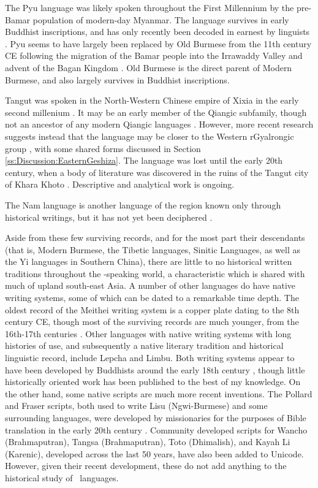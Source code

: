 The Pyu language was likely spoken throughout the First Millennium  by the pre-Bamar population of modern-day Myanmar. The language survives in early Buddhist inscriptions, and has only recently been decoded in earnest by linguists \cites{Griffiths2017}{Miyake2019}. Pyu seems to have largely been replaced by Old Burmese from the 11th century CE following the migration of the Bamar people into the Irrawaddy Valley and advent of the Bagan Kingdom \cites{Wheatley2017}{Griffiths2017}. Old Burmese is the direct parent of Modern Burmese, and also largely survives in Buddhist inscriptions.

Tangut was spoken in the North-Western Chinese empire of Xixia in the early second millenium \cite{Gong2017}. It may be an early member of the Qiangic subfamily, though not an ancestor of any modern Qiangic languages \cite{Matisoff2004}. However, more recent research suggests instead that the language may be closer to the Western rGyalrongic group \cite{Lai2020}, with some shared forms discussed in Section \ref{ss:Discussion:EasternGeshiza}. The language was lost until the early 20th century, when a body of literature was discovered in the ruins of the Tangut city of Khara Khoto \cite{Gong2017}. Descriptive and analytical work is ongoing.

The Nam language is another language of the region known only through historical writings, but it has not yet been deciphered \cite{Ikeda2012}.

Aside from these few surviving records, and for the most part their descendants (that is, Modern Burmese, the Tibetic languages, Sinitic Languages, as well as the Yi languages in Southern China), there are little to no historical written traditions throughout the \lfam-speaking world, a characteristic which is shared with much of upland south-east Asia. A number of other languages do have native writing systems, some of which can be dated to a remarkable time depth. The oldest record of the Meithei writing system is a copper plate dating to the 8th century CE, though most of the surviving records are much younger, from the 16th-17th centuries \cite{Chelliah2000}. Other languages with native writing systems with long histories of use, and subsequently a native literary tradition and historical linguistic record, include Lepcha and Limbu. Both writing systems appear to have been developed by Buddhists around the early 18th century \cite{Plaisier2007}, though little historically oriented work has been published to the best of my knowledge. On the other hand, some native scripts are much more recent inventions. The Pollard and Fraser scripts, both used to write Lisu (Ngwi-Burmese) and some surrounding languages, were developed by missionaries for the purposes of Bible translation in the early 20th century \cite{Bradley2017}. Community developed scripts for Wancho (Brahmaputran), Tangsa (Brahmaputran), Toto (Dhimalish), and Kayah Li (Karenic), developed across the last 50 years, have also been added to Unicode. However, given their recent development, these do not add anything to the historical study of \lfam\ languages.

